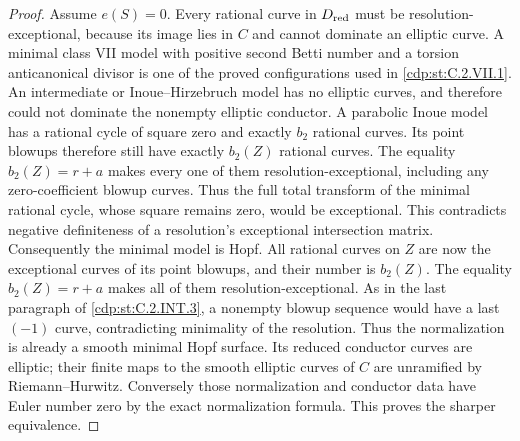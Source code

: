 \begin{proof}
Assume $e(S)=0$. Every rational curve in
$D_{\rm red}$ must be resolution-exceptional,
because its image lies in $C$ and cannot
dominate an elliptic curve. A minimal class
VII model with positive second Betti number
and a torsion anticanonical divisor is one
of the proved configurations used in
\ref{cdp:st:C.2.VII.1}. An intermediate or
Inoue--Hirzebruch model has no elliptic
curves, and therefore could not dominate
the nonempty elliptic conductor. A
parabolic Inoue model has a rational cycle
of square zero and exactly $b_2$ rational
curves. Its point blowups therefore still
have exactly $b_2(Z)$ rational curves.
The equality $b_2(Z)=r+a$ makes every one
of them resolution-exceptional, including
any zero-coefficient blowup curves. Thus
the full total transform of the minimal
rational cycle, whose square remains zero,
would be exceptional. This contradicts
negative definiteness of a resolution's
exceptional intersection matrix.
Consequently the minimal model is Hopf.
All rational curves on $Z$ are now the
exceptional curves of its point blowups,
and their number is $b_2(Z)$.
The equality $b_2(Z)=r+a$ makes all of
them resolution-exceptional. As in the
last paragraph of \ref{cdp:st:C.2.INT.3}, a nonempty
blowup sequence would have a last
$(-1)$ curve, contradicting minimality
of the resolution. Thus the normalization
is already a smooth minimal Hopf surface.
Its reduced conductor curves are elliptic;
their finite maps to the smooth elliptic
curves of $C$ are unramified by
Riemann--Hurwitz.
Conversely those normalization and
conductor data have Euler number zero
by the exact normalization formula.
This proves the sharper equivalence.
\end{proof}


